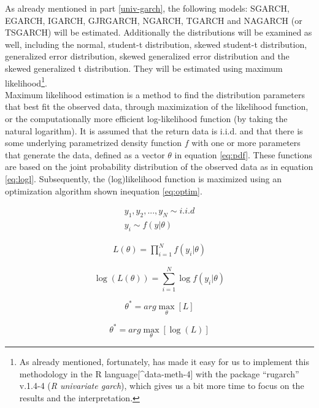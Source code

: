 \documentclass[a4paper, nobind]{templates/ociamthesis}
\begin{document}
\noindent As already mentioned in part \ref{univ-garch}, the following models: SGARCH, EGARCH, IGARCH, GJRGARCH, NGARCH, TGARCH and NAGARCH (or TSGARCH) will be estimated. Additionally the distributions will be examined as well, including the normal, student-t distribution, skewed student-t distribution, generalized error distribution, skewed generalized error distribution and the skewed generalized t distribution. They will be estimated using maximum likelihood\footnote{As already mentioned, fortunately, \textcite{alexios2020} has made it easy for us to implement this methodology in the R language{[}\^{}data-meth-4{]} \autocite{Rteam} with the package ``rugarch'' v.1.4-4 (\emph{R univariate garch}), which gives us a bit more time to focus on the results and the interpretation.}.~\\

\noindent Maximum likelihood estimation is a method to find the distribution parameters that best fit the observed data, through maximization of the likelihood function, or the computationally more efficient log-likelihood function (by taking the natural logarithm). It is assumed that the return data is i.i.d. and that there is some underlying parametrized density function \(f\) with one or more parameters that generate the data, defined as a vector \(\theta\) in equation \eqref{eq:pdf}. These functions are based on the joint probability distribution of the observed data as in equation \eqref{eq:logl}. Subsequently, the (log)likelihood function is maximized using an optimization algorithm shown inequation \eqref{eq:optim}.

\begin{align} 
  y_1,y_2,...,y_N \sim i.i.d
    \\
  y_i \sim f(y|\theta)
 \label{eq:pdf}
\end{align}

\begin{align} 
 L(\theta) = \prod^N_{i=1}f(y_i|\theta)
 \label{eq:logl}
\end{align}

\[\log(L(\theta)) = \sum^N_{i=1} \log f(y_i |\theta)\]

\begin{equation} 
\theta^{*} = arg \max_{\theta} [ L] 
 \label{eq:optim}
\end{equation}

\begin{equation} 
\theta^{*} = arg \max_{\theta} [\log(L)]
\end{equation}
\end{document}
